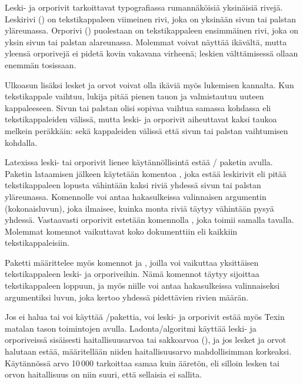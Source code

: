 Leski- ja orporivit tarkoittavat typografiassa rumannäköisiä yksinäisiä
rivejä. Leskirivi () on tekstikappaleen viimeinen rivi,
joka on yksinään sivun tai palstan yläreunassa. Orporivi
() puolestaan on tekstikappaleen ensimmäinen rivi, joka
on yksin sivun tai palstan alareunassa. Molemmat voivat näyttää
ikävältä, mutta yleensä orporivejä ei pidetä kovin vakavana virheenä;
leskien välttämisessä ollaan enemmän tosissaan.

Ulkoasun lisäksi lesket ja orvot voivat olla ikäviä myös lukemisen
kannalta. Kun tekstikappale vaihtuu, lukija pitää pienen tauon ja
valmistautuu uuteen kappaleeseen. Sivun tai palstan olisi sopivaa
vaihtua samassa kohdassa eli tekstikappaleiden välissä, mutta leski- ja
orporivit aiheuttavat kaksi taukoa melkein peräkkäin: sekä kappaleiden
välissä että sivun tai palstan vaihtumisen kohdalla.

Latexissa leski- tai orporivit lienee käytännöllisintä estää
\-/ paketin avulla. Paketin lataamisen jälkeen
käytetään komentoa , joka estää leskirivit eli
pitää tekstikappaleen lopusta vähintään kaksi riviä yhdessä sivun tai
palstan yläreunassa. Komennolle voi antaa hakasulkeissa valinnaisen
argumentin (kokonaisluvun), joka ilmaisee, kuinka monta riviä täytyy
vähintään pysyä yhdessä. Vastaavasti orporivit estetään komennolla
, joka toimii samalla tavalla. Molemmat komennot
vaikuttavat koko dokumenttiin eli kaikkiin tekstikappaleisiin.

\begin{koodilohkosis}
\usepackage{nowidow}
\setnowidow   %
\setnoclub    %
\end{koodilohkosis}

\noindent
Paketti  määrittelee myös komennot 
ja , joilla voi vaikuttaa yksittäisen tekstikappaleen
leski- ja orporiveihin. Nämä komennot täytyy sijoittaa tekstikappaleen
loppuun, ja myös niille voi antaa hakasulkeissa valinnaiseksi
argumentiksi luvun, joka kertoo yhdessä pidettävien rivien määrän.

Jos ei halua tai voi käyttää \-/pakettia, voi leski- ja
orporivit estää myös Texin matalan tason toimintojen avulla.
Ladonta\-/algoritmi käyttää leski- ja orporiveissä sisäisesti
haitallisuusarvoa tai sakkoarvoa (), ja jos lesket ja
orvot halutaan estää, määritellään niiden haitallisuusarvo
mahdollisimman korkeaksi. Käytännössä arvo 10\,000 tarkoittaa samaa kuin
ääretön, eli silloin lesken tai orvon haitallisuus on niin suuri, että
sellaisia ei sallita.

